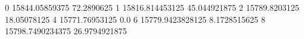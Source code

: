 0 15844.05859375 72.2890625
1 15816.814453125 45.044921875
2 15789.8203125 18.05078125
4 15771.76953125 0.0
6 15779.9423828125 8.1728515625
8 15798.7490234375 26.9794921875
